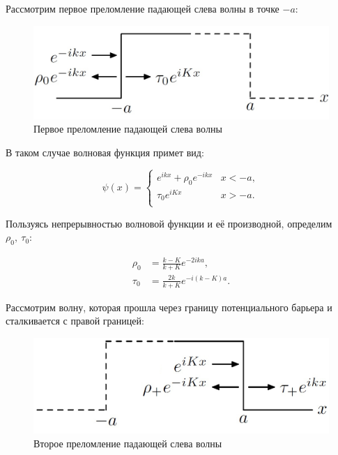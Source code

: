 \documentclass[a4 paper, 12 pt]{extarticle}
\begin{document}
   Рассмотрим первое преломление падающей слева волны в точке $-a$:
   
   \begin{figure}[!htb]
   	\centering
   	\includegraphics[scale=0.25]{reflect1.jpg}
   	\caption{Первое преломление падающей слева волны}
   \end{figure}

   В таком случае волновая функция примет вид:
   
   \begin{equation*}
   \psi(x)=\left\{%
   \begin{array}{ll}
   e^{ikx}+\rho_0e^{-ikx} & x<-a, \\
   \tau_0 e^{iKx} & x>-a. \\
   \end{array}%
   \right.
   \end{equation*}

   Пользуясь непрерывностью волновой функции и её производной, определим $\rho_0, \ \tau_0$:

   \[
   \begin{aligned}
   \rho_0&=\frac{k-K}{k+K}e^{-2ika},\\
   \tau_0&=\frac{2k}{k+K}e^{-i(k-K)a}.
   \end{aligned}\]
   
   Рассмотрим волну, которая прошла через границу потенциального барьера и сталкивается с правой границей:
   
   \begin{figure}[!htb]
   	\centering
   	\includegraphics[scale=0.25]{reflect2.jpg}
   	\caption{Второе преломление падающей слева волны}
   \end{figure}
\end{document}
